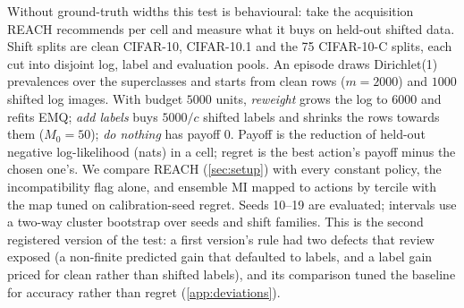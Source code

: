\documentclass[twoside]{article}
\begin{document}
Without ground-truth widths this test is behavioural: take the acquisition REACH recommends per cell
and measure what it buys on held-out shifted data. Shift splits are clean CIFAR-10, CIFAR-10.1
\citep{recht2018cifar} and the 75 CIFAR-10-C splits, each cut into disjoint log, label and evaluation
pools. An episode draws Dirichlet(1) prevalences over the superclasses and starts from clean rows
($m=2000$) and $1000$ shifted log images. With budget $5000$ units, \emph{reweight} grows the log to
$6000$ and refits EMQ; \emph{add labels} buys $5000/c$ shifted labels and shrinks the rows towards them
($M_0=50$); \emph{do nothing} has payoff $0$. Payoff is the reduction of held-out negative
log-likelihood (nats) in a cell; regret is the best action's payoff minus the chosen one's. We compare
REACH (\cref{sec:setup}) with every constant policy, the incompatibility flag alone, and ensemble MI
mapped to actions by tercile with the map tuned on calibration-seed regret. Seeds 10--19 are
evaluated; intervals use a two-way cluster bootstrap over seeds and shift families. This is the second
registered version of the test: a first version's rule had two defects that review exposed (a
non-finite predicted gain that defaulted to labels, and a label gain priced for clean rather than
shifted labels), and its comparison tuned the baseline for accuracy rather than regret
(\cref{app:deviations}).

\begin{table}[t]
\centering\small
\caption{Mean regret (nats per cell) by policy. Left: price 1:50 by shift family; right: all 77
splits at prices 1:50 and 1:250. Evaluation seeds; prior strength $M_0=50$.}
\label{tab:blindspot}
\setlength{\tabcolsep}{3pt}
\end{table}
\end{document}
